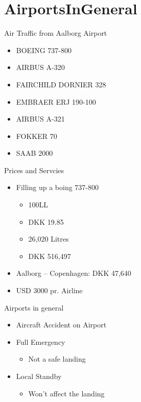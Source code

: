 \section{AirportsInGeneral}
\begin{frame}{Air Traffic from Aalborg Airport}{}
	\begin{itemize}
		\item BOEING 737-800 
		\item AIRBUS A-320 
		\item FAIRCHILD DORNIER 328 
		\item EMBRAER ERJ 190-100 
		\item AIRBUS A-321 
		\item FOKKER 70 
		\item SAAB 2000 
	\end{itemize}
\end{frame}
\begin{frame}{Prices and Servcies}{}
	\begin{itemize}
		\item Filling up a boing 737-800
			\begin{itemize}
				\item 100LL
				\item DKK 19.85
				\item 26,020 Litres
				\item DKK 516,497
			\end{itemize}
		\item Aalborg – Copenhagen: DKK 47,640
		\item USD 3000 pr. Airline
	\end{itemize}
\end{frame}
\begin{frame}{Airports in general}{}
	\begin{itemize}
		\item Aircraft Accident on Airport
		\item Full Emergency
			\begin{itemize}
				\item Not a safe landing
			\end{itemize}
		\item Local Standby
			\begin{itemize}
				\item Won't affect the landing
			\end{itemize}
	\end{itemize}
\end{frame}